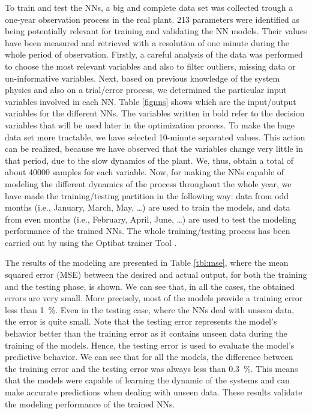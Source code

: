 To train and test the NNs, a big and complete data set was collected trough a one-year observation process in the real plant.  213 parameters were identified as being potentially relevant for training and validating the NN models. Their values have been measured and retrieved with a resolution of one minute during the whole period of observation. Firstly, a careful analysis of the data was performed to choose the most relevant variables and also to filter outliers, missing data or un-informative variables. Next, based on previous knowledge of the system physics and also on a trial/error process, we determined the particular input variables involved in each NN. Table \ref{fignns} shows which are the input/output variables for the different NNs. The variables written in bold refer to the decision variables that will be used later in the optimization process. To make the huge data set more tractable, we have selected 10-minute separated values. This action can be realized, because we have observed that the variables change very little in that period, due to the slow dynamics of the plant. We, thus, obtain a total of about \num{40000} samples for each variable. Now, for making the NNs capable of modeling the different dynamics of the process throughout the whole year, we have made the training/testing partition in the following way: data from odd months (i.e., January, March, May, \dots) are used to train the models, and data from even months (i.e., February, April, June, \dots) are used to test the modeling performance of the trained NNs. The whole training/testing process has been carried out by using the Optibat trainer Tool \cite{Optibat}.


The results of the modeling are presented in Table \ref{tbl:mse}, where the mean squared error (MSE) between the desired and actual output, for both the training and the testing phase, is shown. We can see that, in all the cases, the obtained  errors are very small. More precisely, most of the models provide a training error less than \SI{1}{\percent}. Even in the testing case, where the NNs deal with unseen data, the error is quite small. Note that the testing error represents the model's behavior better than the training error as it contains unseen data during the training of the models. Hence, the testing error is used to evaluate the  model's  predictive behavior. We can see that for all the models, the difference between the training error and the testing error was always less than \SI{0.3}{\percent}. This means that the models were capable of learning the dynamic of the systems and can make accurate predictions when dealing with unseen data. These results validate the modeling performance of the trained NNs. 



